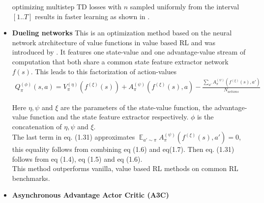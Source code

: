 \begin{itemize}
	optimizing multistep TD losses with $n$ sampled uniformly from the interval $[1..T]$ results in faster learning as shown in \cite{SBQL}.
	
	\item \textbf{Dueling networks} This is an optimization method based on the neural network atrchitecture of value functions in value based RL and was introduced by \cite{DBLP:journals/corr/WangFL15}. It features one state-value and one advantage-value stream of computation that both share a common state feature extractor network $f(s)$. This leads to this factorization of action-values
	\begin{align}
		Q_{\pi}^{(\phi)}(s, a) = V_{\pi}^{(\eta)}(f^{(\xi)}(s)) + A_{\pi}^{(\psi)}(f^{(\xi)}(s), a) - \frac{\sum_{a'} A_{\pi}^{(\psi)}(f^{(\xi)}(s), a')}{N_{actions}}
	\end{align}
	
	Here $\eta, \psi$ and $\xi$ are the parameters of the state-value function, the advantage-value function and the state feature extractor respectively. $\phi$ is the concatenation of $\eta, \psi$ and $\xi$.\\
	The last term in eq. (1.31) approximates $\mathop{\mathbb{E}}_{a' \sim \pi} A_{\pi}^{(\psi)}(f^{(\xi)}(s), a')=0$, this equality follows from combining eq (1.6) and eq(1.7). Then eq. (1.31) follows from eq (1.4), eq (1.5) and eq (1.6).\\
	This method outperforms vanilla, value based RL methods on common RL benchmarks. 
	
	\item \textbf{Asynchronous Advantage Actor Critic (A3C)} \label{ssec::a3c} \cite{mnih2016asynchronous}
	
\end{itemize}
